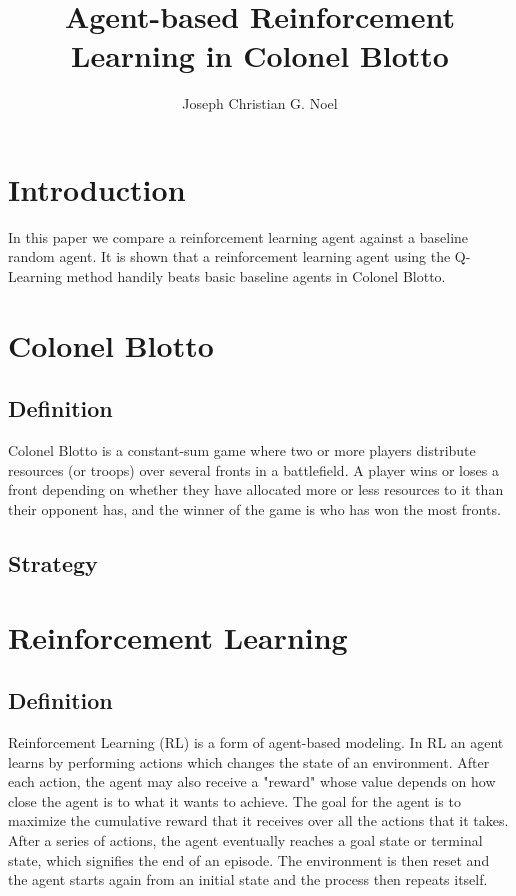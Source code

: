 \documentclass[11pt, oneside]{article}   	%
\title{Agent-based Reinforcement Learning in Colonel Blotto}
\author{Joseph Christian G. Noel}
\date{}							%
\begin{document}
\maketitle

\section{Introduction}

In this paper we compare a reinforcement learning agent against a baseline random agent. It is shown that a reinforcement learning agent using the Q-Learning method handily beats basic baseline agents in Colonel Blotto.

\section{Colonel Blotto}

\subsection{Definition}

Colonel Blotto is a constant-sum game where two or more players distribute resources (or troops) over several fronts in a battlefield. A player wins or loses a front depending on whether they have allocated more or less resources to it than their opponent has, and the winner of the game is who has won the most fronts.

\subsection{Strategy}


\section{Reinforcement Learning}

\subsection{Definition}

Reinforcement Learning (RL) is a form of agent-based modeling. In RL an agent learns by performing actions which changes the state of an environment. After each action, the agent may also receive a "reward" whose value depends on how close the agent is to what it wants to achieve. The goal for the agent is to maximize the cumulative reward that it receives over all the actions that it takes. After a series of actions, the agent eventually reaches a goal state or terminal state, which signifies the end of an episode. The environment is then reset and the agent starts again from an initial state and the process then repeats itself.
\end{document}
